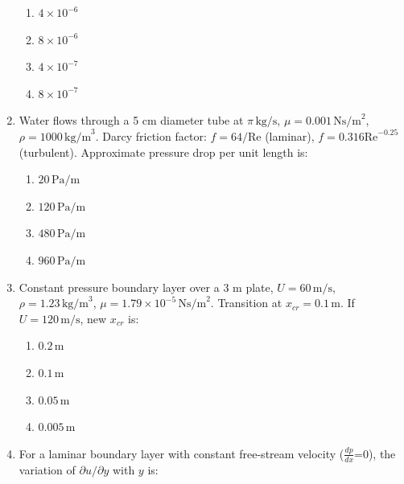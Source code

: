 \documentclass[journal,cmex10]{IEEEtran}
\theoremstyle{remark}
\numberwithin{equation}{enumi}
\numberwithin{figure}{enumi}
\begin{document}
\begin{enumerate}[label=\arabic*)]
\begin{enumerate}[label=\alph*)]
    \item $4 \times 10^{-6}$
    \item $8 \times 10^{-6}$
    \item $4 \times 10^{-7}$
    \item $8 \times 10^{-7}$
\end{enumerate}

\vspace{0.5cm}
\item Water flows through a 5 cm diameter tube at $\pi\,\text{kg/s}$, $\mu=0.001\,\text{Ns/m}^2$, $\rho = 1000\,\text{kg/m}^3$. Darcy friction factor: $f=64/\text{Re}$ (laminar), $f=0.316 \text{Re}^{-0.25}$ (turbulent). Approximate pressure drop per unit length is:  
\hfill{}

\begin{enumerate}[label=\alph*)]
    \item $20\,\text{Pa/m}$
    \item $120\,\text{Pa/m}$
    \item $480\,\text{Pa/m}$
    \item $960\,\text{Pa/m}$
\end{enumerate}

\vspace{0.5cm}
\item Constant pressure boundary layer over a 3 m plate, $U=60\,\text{m/s}$, $\rho=1.23\,\text{kg/m}^3$, $\mu=1.79 \times 10^{-5}\,\text{Ns/m}^2$. Transition at $x_{cr}=0.1\,\text{m}$. If $U=120\,\text{m/s}$, new $x_{cr}$ is:
\vspace{0.1cm}
\hfill{}

\begin{enumerate}[label=\alph*)]
    \item $0.2\,\text{m}$
    \item $0.1\,\text{m}$
    \item $0.05\,\text{m}$
    \item $0.005\,\text{m}$
\end{enumerate}

\vspace{0.5cm}
\item For a laminar boundary layer with constant free-stream velocity ($\frac{dp}{dx}$=0), the variation of $\partial u / \partial y$ with $y$ is:  
\hfill{}


\end{enumerate}
\end{document}
